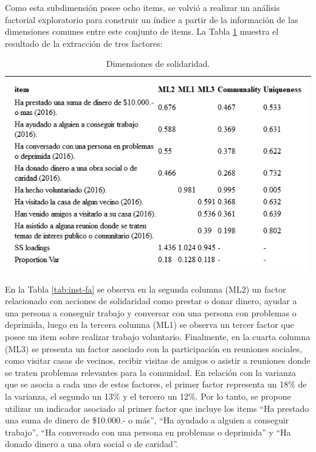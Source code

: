 \documentclass[
  12pt,
]{book}
\begin{document}
Como esta subdimensión posee ocho items, se volvió a realizar un análisis factorial exploratorio para construir un índice a partir de la información de las dimensiones comunes entre este conjunto de items. La Tabla \ref{tab:solidaridad-fa} muestra el resultado de la extracción de tres factores:

\begin{longtable}[]{@{}l@{}}
\caption{\label{tab:solidaridad-fa}Dimensiones de solidaridad.}\tabularnewline
\toprule
\endhead
\includegraphics[width=8.33333in,height=\textheight]{output/tables/solidaridad_fa.png}\tabularnewline
\bottomrule
\end{longtable}

En la Tabla \ref{tab:inst-fa} se observa en la segunda columna (ML2) un factor relacionado con acciones de solidaridad como prestar o donar dinero, ayudar a una persona a conseguir trabajo y conversar con una persona con problemas o deprimida, luego en la tercera columna (ML1) se observa un tercer factor que posee un item sobre realizar trabajo voluntario. Finalmente, en la cuarta columna (ML3) se presenta un factor asociado con la participación en reuniones sociales, como visitar casas de vecinos, recibir visitas de amigos o asistir a reuniones donde se traten problemas relevantes para la comunidad. En relación con la varianza que se asocia a cada uno de estos factores, el primer factor representa un 18\% de la varianza, el segundo un 13\% y el tercero un 12\%. Por lo tanto, se propone utilizar un indicador asociado al primer factor que incluye los items ``Ha prestado una suma de dinero de \$10.000.- o más'', ``Ha ayudado a alguien a conseguir trabajo'', ``Ha conversado con una persona en problemas o deprimida'' y ``Ha donado dinero a una obra social o de caridad''.
\end{document}
